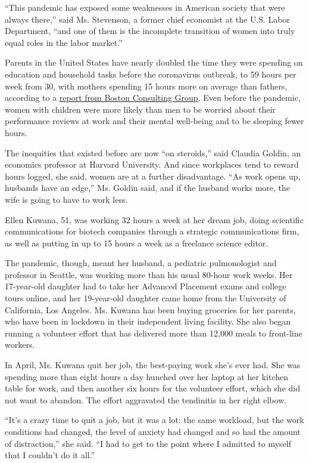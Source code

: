 ``This pandemic has exposed some weaknesses in American society that
were always there,'' said Ms. Stevenson, a former chief economist at the
U.S. Labor Department, ``and one of them is the incomplete transition of
women into truly equal roles in the labor market.''

Parents in the United States have nearly doubled the time they were
spending on education and household tasks before the coronavirus
outbreak, to 59 hours per week from 30, with mothers spending 15 hours
more on average than fathers, according to a
\href{https://www.bcg.com/publications/2020/helping-working-parents-ease-the-burden-of-covid-19.aspx}{report
from Boston Consulting Group}. Even before the pandemic, women with
children were more likely than men to be worried about their performance
reviews at work and their mental well-being and to be sleeping fewer
hours.

The inequities that existed before are now ``on steroids,'' said Claudia
Goldin, an economics professor at Harvard University. And since
workplaces tend to reward hours logged, she said, women are at a further
disadvantage. ``As work opens up, husbands have an edge,'' Ms. Goldin
said, and if the husband works more, the wife is going to have to work
less.

Ellen Kuwana, 51, was working 32 hours a week at her dream job, doing
scientific communications for biotech companies through a strategic
communications firm, as well as putting in up to 15 hours a week as a
freelance science editor.

The pandemic, though, meant her husband, a pediatric pulmonologist and
professor in Seattle, was working more than his usual 80-hour work
weeks. Her 17-year-old daughter had to take her Advanced Placement exams
and college tours online, and her 19-year-old daughter came home from
the University of California, Los Angeles. Ms. Kuwana has been buying
groceries for her parents, who have been in lockdown in their
independent living facility. She also began running a volunteer effort
that has delivered more than 12,000 meals to front-line workers.

In April, Ms. Kuwana quit her job, the best-paying work she's ever had.
She was spending more than eight hours a day hunched over her laptop at
her kitchen table for work, and then another six hours for the volunteer
effort, which she did not want to abandon. The effort aggravated the
tendinitis in her right elbow.

``It's a crazy time to quit a job, but it was a lot: the same workload,
but the work conditions had changed, the level of anxiety had changed
and so had the amount of distraction,'' she said. ``I had to get to the
point where I admitted to myself that I couldn't do it all.''

